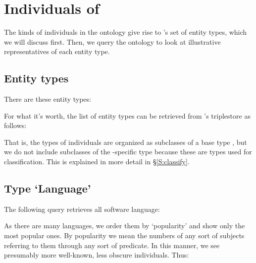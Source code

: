 
\section{Individuals of \solasote}
\label{S:entities}

The kinds of individuals in the ontology give rise to \solasote's set
of entity types, which we will discuss first. Then, we query the
ontology to look at illustrative representatives of each entity type.


\subsection{Entity types}

There are these entity types:


\noindent
For what it's worth, the list of entity types can be retrieved from
\solasote's triplestore as follows:


\noindent
That is, the types of individuals are organized as subclasses of a
base type , but we do not include subclasses of the
\solasote-specific type  because these are types
used for classification. This is explained in more detail in
\S\ref{S:classify}.


\subsection{Type `Language'}

The following query retrieves all software language:


\noindent
As there are many languages, we order them by `popularity' and show
only the most popular ones. By popularity we mean the numbers of any
sort of subjects referring to them through any sort of predicate. In
this manner, we see presumably more well-known, less obscure
individuals. Thus:



